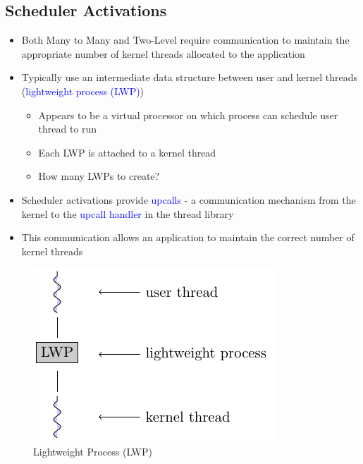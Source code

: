 \documentclass[oneside]{book}
\begin{document}
            \subsection{Scheduler Activations}
                \begin{itemize}
                    \item Both Many to Many and Two-Level require communication to maintain the appropriate 
                    number of kernel threads allocated to the application
                    \item Typically use an intermediate data structure between user and kernel threads (\textcolor{blue}{lightweight process (LWP)})
                        \begin{itemize}
                            \item Appears to be a virtual processor on which process can schedule user thread to run
                            \item Each LWP is attached to a kernel thread
                            \item How many LWPs to create?
                        \end{itemize}
                    \item Scheduler activations provide \textcolor{blue}{upcalls} - a communication mechanism from the kernel
                    to the \textcolor{blue}{upcall handler} in the thread library
                    \item This communication allows an application to maintain the correct number of kernel threads
                \end{itemize}
                \begin{figure}[H]
                    \centering
                    \includegraphics{figures/lwp.pdf}
                    \caption{Lightweight Process (LWP)}
                \end{figure}
\end{document}
